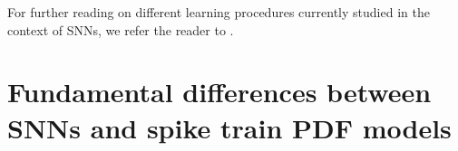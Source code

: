 \documentclass[mphil,deptreport,ianc]{infthesis} %
\begin{document}

For further reading on different learning procedures currently studied in the context of SNNs, we refer the reader to \cite{Taherkhani2020}.



\section{Fundamental differences between SNNs and spike train PDF models}
\end{document}
